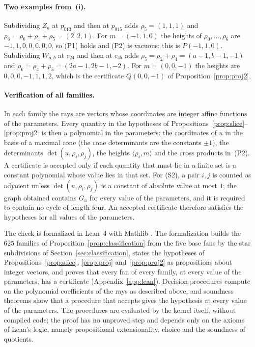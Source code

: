 \documentclass[12pt]{article}
\newcommand{\inn}[2]{\langle #1,#2\rangle}
\begin{document}
\paragraph{Two examples from~(i).} Subdividing $Z_a$ at $p_{013}$ and then at $p_{015}$ adds $\rho_5=(1,1,1)$ and $\rho_6=\rho_0+\rho_1+\rho_5=(2,2,1)$. For $m=(-1,1,0)$ the heights of $\rho_0,\dots,\rho_6$ are $-1,1,0,0,0,0,0$, so (P1) holds and (P2) is vacuous: this is $P(-1,1,0)$. Subdividing $W_{a,b}$ at $c_{24}$ and then at $c_{45}$ adds $\rho_5=\rho_2+\rho_4=(a-1,b-1,-1)$ and $\rho_6=\rho_4+\rho_5=(2a-1,2b-1,-2)$. For $m=(0,0,-1)$ the heights are $0,0,0,-1,1,1,2$, which is the certificate $Q(0,0,-1)$ of Proposition~\ref{prop:proj2}.

\paragraph{Verification of all families.} In each family the rays are vectors whose coordinates are integer affine functions of the parameters. Every quantity in the hypotheses of Propositions~\ref{prop:slice}--\ref{prop:proj2} is then a polynomial in the parameters: the coordinates of $u$ in the basis of a maximal cone (the cone determinants are the constants $\pm1$), the determinants $\det(u,\rho_i,\rho_j)$, the heights $\inn{\rho_i}{m}$ and the cross products in~(P2). A certificate is accepted only if each quantity that must lie in a finite set is a constant polynomial whose value lies in that set. For (S2), a pair $i,j$ is counted as adjacent unless $\det(u,\rho_i,\rho_j)$ is a constant of absolute value at most $1$; the graph obtained contains $G_u$ for every value of the parameters, and it is required to contain no cycle of length four. An accepted certificate therefore satisfies the hypotheses for all values of the parameters.

The check is formalized in Lean~4 \cite{Lean4} with Mathlib \cite{mathlib}. The formalization builds the $625$ families of Proposition~\ref{prop:classification} from the five base fans by the star subdivisions of Section~\ref{sec:classification}, states the hypotheses of Propositions~\ref{prop:slice}, \ref{prop:proj} and~\ref{prop:proj2} as propositions about integer vectors, and proves that every fan of every family, at every value of the parameters, has a certificate (Appendix~\ref{app:lean}). Decision procedures compute on the polynomial coefficients of the rays as described above, and soundness theorems show that a procedure that accepts gives the hypothesis at every value of the parameters. The procedures are evaluated by the kernel itself, without compiled code; the proof has no unproved step and depends only on the axioms of Lean's logic, namely propositional extensionality, choice and the soundness of quotients.
\end{document}
